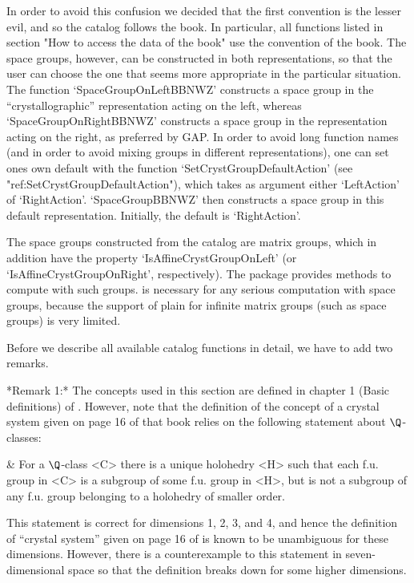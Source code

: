 In order to avoid this confusion we decided that the first convention
is the lesser evil, and so the {\GAP} catalog follows the book. In
particular, all functions listed in section "How to access the data 
of the book" use the convention of the book. The space groups, however,
can be constructed in both representations, so that the user can choose
the one that seems more appropriate in the particular situation.
The function `SpaceGroupOnLeftBBNWZ' constructs a space group in
the ``crystallographic'' representation acting on the left,
whereas `SpaceGroupOnRightBBNWZ' constructs a space group in the
representation acting on the right, as preferred by GAP. In order to 
avoid long function names (and in order to avoid mixing groups in
different representations), one can set one{\pif}s own default 
with the function `SetCrystGroupDefaultAction' 
(see "ref:SetCrystGroupDefaultAction"), 
which takes as argument either `LeftAction' of `RightAction'. 
`SpaceGroupBBNWZ' then constructs a space group in this default
representation. Initially, the default is `RightAction'.

The space groups constructed from the catalog are matrix groups, which
in addition have the property `IsAffineCrystGroupOnLeft' (or
`IsAffineCrystGroupOnRight', respectively). The package {\Cryst}
provides methods to compute with such groups. {\Cryst} is necessary
for any serious computation with space groups, because the support of
plain {\GAP} for infinite matrix groups (such as space groups) is very
limited.

Before we describe all available catalog functions in detail, we have
to add two remarks.

*Remark 1:*
The concepts  used  in  this section are   defined  in chapter 1   (Basic
definitions) of \cite{BBNWZ78}.  However, note that the definition of the
concept of a crystal system given on page  16 of that  book relies on the
following statement about $\Q$-classes:

\beginitems
& For a  $\Q$-class  <C>  there is a unique holohedry <H> such that
  each  f.u. group in <C>  is a subgroup of some  f.u. group in
  <H>,  but is not  a subgroup of any  f.u. group  belonging to a
  holohedry of smaller order.
\enditems

This  statement is correct for  dimensions 1, 2,  3, and 4, and hence the
definition of ``crystal system'' given on page 16 of \cite{BBNWZ78} is
known  to   be unambiguous for   these  dimensions.  However, there  is a
counterexample to  this statement in seven-dimensional  space so that the
definition breaks down for some higher dimensions.

